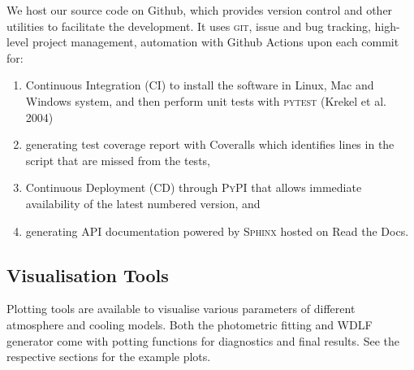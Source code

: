 \documentclass[fleqn,usenatbib]{rasti}
\begin{document}
We host our source code on Github, which provides version control and other
utilities to facilitate the development. It uses \textsc{git}, issue and bug
tracking, high-level project management, automation with Github Actions upon
each commit for:

\begin{enumerate}
    \item Continuous Integration (CI) to install the software in Linux, Mac
    and Windows system, and then perform unit tests with \textsc{pytest}
    (Krekel et al. 2004)
    \item generating test coverage report with Coveralls which identifies
    lines in the script that are missed from the tests,
    \item Continuous Deployment (CD) through \textsc{PyPI} that allows
    immediate availability of the latest numbered version, and
    \item generating API documentation powered by \textsc{Sphinx} hosted on
    Read the Docs.
\end{enumerate}

% 

\subsection{Visualisation Tools}
Plotting tools are available to visualise various parameters of different
atmosphere and cooling models. Both the photometric fitting and WDLF generator
come with potting functions for diagnostics and final results. See the
respective sections for the example plots.
\end{document}
